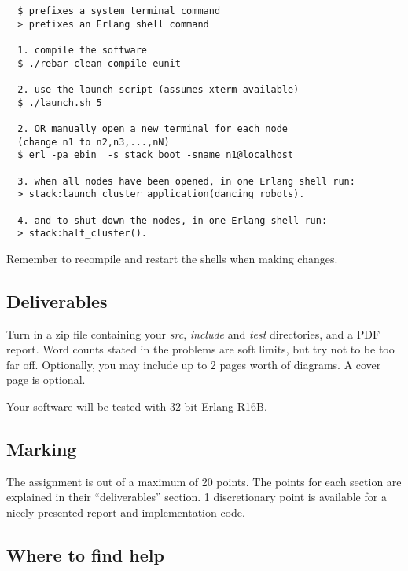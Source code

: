 \documentclass[a4paper]{article}
\begin{document}
\begin{verbatim}
  $ prefixes a system terminal command
  > prefixes an Erlang shell command

  1. compile the software
  $ ./rebar clean compile eunit

  2. use the launch script (assumes xterm available)
  $ ./launch.sh 5

  2. OR manually open a new terminal for each node
  (change n1 to n2,n3,...,nN)
  $ erl -pa ebin  -s stack boot -sname n1@localhost

  3. when all nodes have been opened, in one Erlang shell run:
  > stack:launch_cluster_application(dancing_robots).

  4. and to shut down the nodes, in one Erlang shell run:
  > stack:halt_cluster().
\end{verbatim}

Remember to recompile and restart the shells when making changes.


\subsection*{Deliverables} %
\label{sub:deliverables}

Turn in a zip file containing your \emph{src}, \emph{include} and \emph{test}
directories, and a PDF report. Word counts stated in the problems are soft
limits, but try not to be too far off. Optionally, you may include up to 2
pages worth of diagrams. A cover page is optional.

Your software will be tested with 32-bit Erlang R16B.


\subsection*{Marking} %
\label{sub:marking}

The assignment is out of a maximum of 20 points. The points for each section
are explained in their ``deliverables'' section. 1 discretionary point is
available for a nicely presented report and implementation code.




\subsection*{Where to find help} %
\label{sub:where_to_find_help}
\end{document}
